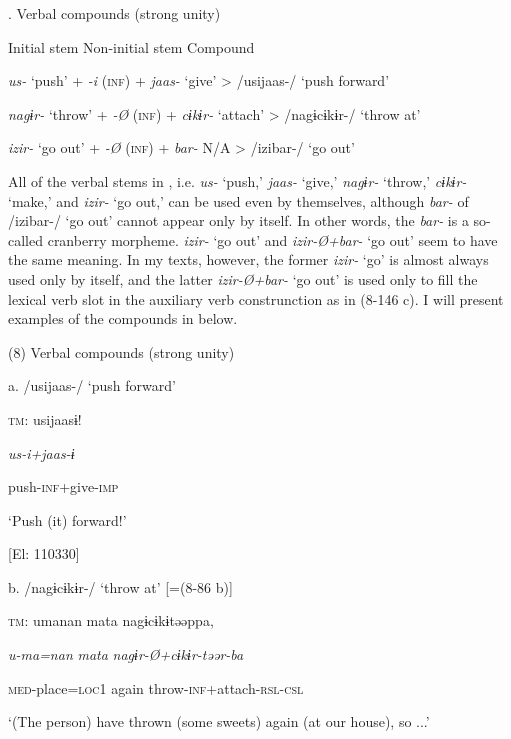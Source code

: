 \begin{styleBeschriftung}
\textmd{}\textmd{. Verbal compounds (strong unity)}
\end{styleBeschriftung}

Initial stem    Non-initial stem    Compound

\textit{us-}  ‘push’  +  \textit{{}-i} (\textsc{inf})  +  \textit{jaas-}  ‘give’  >  /usijaas-/  ‘push forward’

\textit{nagɨr-}  ‘throw’  +  \textit{{}-Ø} (\textsc{inf})  +  \textit{cɨkɨr-}  ‘attach’  >  /nagɨcɨkɨr-/  ‘throw at’

\textit{izir-}  ‘go out’  +  \textit{{}-Ø} (\textsc{inf})  +  \textit{bar-}  N/A  >  /izibar-/  ‘go out’

All of the verbal stems in , i.e. \textit{us-} ‘push,’ \textit{jaas-} ‘give,’ \textit{nagɨr-} ‘throw,’ \textit{cɨkɨr-} ‘make,’ and \textit{izir-} ‘go out,’ can be used even by themselves, although \textit{bar-} of /izibar-/ ‘go out’ cannot appear only by itself. In other words, the \textit{bar-} is a so-called cranberry morpheme. \textit{izir-} ‘go out’ and \textit{izir-Ø+bar-} ‘go out’ seem to have the same meaning. In my texts, however, the former \textit{izir-} ‘go’ is almost always used only by itself, and the latter \textit{izir-Ø+bar-} ‘go out’ is used only to fill the lexical verb slot in the auxiliary verb construnction as in (8-146 c). I will present examples of the compounds in  below.

(8)  Verbal compounds (strong unity)

  a.  /usijaas-/ ‘push forward’

    \textsc{tm}:  usijaasɨ!

      \textit{us-i+jaas{}-ɨ}

      push-\textsc{inf}+give-\textsc{imp}

      ‘Push (it) forward!’

      [El: 110330]

  b.  /nagɨcɨkɨr-/ ‘throw at’ [=(8-86 b)]

    \textsc{tm}:  umanan  mata  nagɨcɨkɨtəəppa,

      \textit{u-ma=nan}  \textit{mata}  \textit{nagɨr-Ø+cɨkɨr{}-təər-ba}

      \textsc{med}-place=\textsc{loc}1  again  throw-\textsc{inf}+attach-\textsc{rsl}-\textsc{csl}

      ‘(The person) have thrown (some sweets) again (at our house), so ...’

